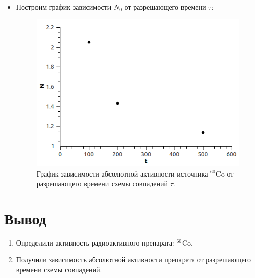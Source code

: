 \documentclass[a4paper,12pt]{article}
\theoremstyle{plain} %
\theoremstyle{definition} %
\theoremstyle{remark} %
\begin{document}
\begin{itemize}
\item Построим график зависимости $N_0$ от разрешающего времени $\tau$:
\begin{figure}[H]
\includegraphics[scale=0.5]{3}
\caption{График зависимости абсолютной активности источника $^{60}\text{Co}$ от разрешающего времени схемы совпадений $\tau$.}
\end{figure}
	
\end{itemize}

\section{Вывод}
\begin{enumerate}
    \item Определили активность радиоактивного препарата: $^{60}\text{Co}$.
    \item  Получили  зависимость абсолютной активности препарата от разрешающего времени схемы совпадений.
\end{enumerate}{}
\end{document}
